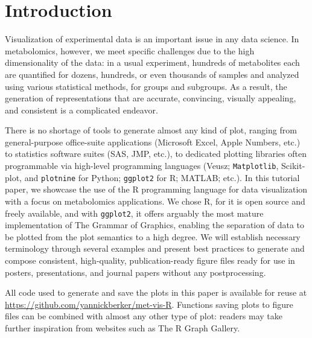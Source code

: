 \documentclass[AMA,LATO1COL]{WileyNJD-v2}
\begin{document}

\maketitle

\section{Introduction}

Visualization of experimental data is an important issue in any data science. In
metabolomics, however, we meet specific challenges due to the high
dimensionality of the data: in a usual experiment, hundreds of metabolites each
are quantified for dozens, hundreds, or even thousands of samples and analyzed
using various statistical methods, for groups and subgroups. As a result, the
generation of representations that are accurate, convincing, visually appealing,
and consistent is a complicated endeavor.

There is no shortage of tools to generate almost any kind of plot, ranging from
general-purpose office-suite applications (Microsoft Excel, Apple Numbers, etc.)
to statistics software suites (SAS, JMP, etc.), to dedicated plotting libraries
often programmable via high-level programming languages (Veusz;
\texttt{Matplotlib}, Scikit-plot, and \texttt{plotnine} for Python;
\texttt{ggplot2} for R; MATLAB; etc.). In this tutorial paper, we showcase the
use of the R programming language for data visualization with a focus on
metabolomics applications. We chose R, for it is open source and freely
available, and with \texttt{ggplot2}, \cite{ggplot2} it offers arguably the most
mature implementation of The Grammar of Graphics, \cite{gog} enabling the
separation of data to be plotted from the plot semantics to a high degree. We
will establish necessary terminology through several examples and present best
practices to generate and compose consistent, high-quality, publication-ready
figure files ready for use in posters, presentations, and journal papers without
any postprocessing.

All code used to generate and save the plots in this paper is available for
reuse at \url{https://github.com/yannickberker/met-vis-R}. Functions saving
plots to figure files can be combined with almost any other type of plot:
readers may take further inspiration from websites such as The R Graph Gallery.
\cite{RGraphs}
\end{document}
